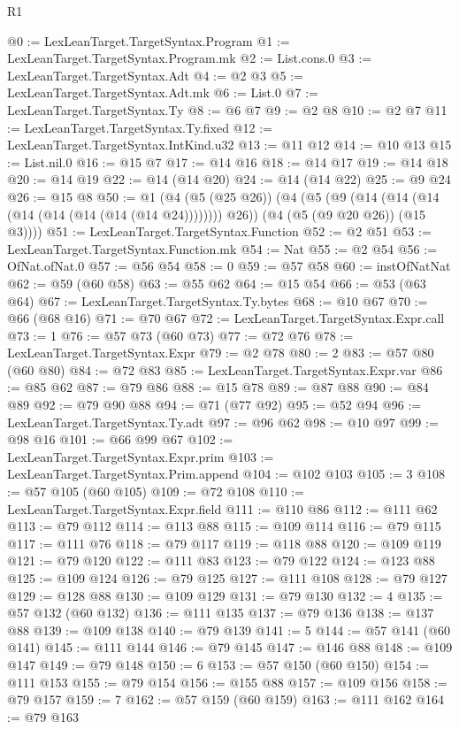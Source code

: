 \begin{lexlean}{R1}
\begin{coremodule}
@0 := LexLeanTarget.TargetSyntax.Program
@1 := LexLeanTarget.TargetSyntax.Program.mk
@2 := List.cons.{0}
@3 := LexLeanTarget.TargetSyntax.Adt
@4 := @2 @3
@5 := LexLeanTarget.TargetSyntax.Adt.mk
@6 := List.{0}
@7 := LexLeanTarget.TargetSyntax.Ty
@8 := @6 @7
@9 := @2 @8
@10 := @2 @7
@11 := LexLeanTarget.TargetSyntax.Ty.fixed
@12 := LexLeanTarget.TargetSyntax.IntKind.u32
@13 := @11 @12
@14 := @10 @13
@15 := List.nil.{0}
@16 := @15 @7
@17 := @14 @16
@18 := @14 @17
@19 := @14 @18
@20 := @14 @19
@22 := @14 (@14 @20)
@24 := @14 (@14 @22)
@25 := @9 @24
@26 := @15 @8
@50 := @1
    (@4
      (@5 (@25 @26))
      (@4
        (@5 (@9 (@14 (@14 (@14 (@14 (@14 (@14 (@14 (@14 @24)))))))) @26))
        (@4 (@5 (@9 @20 @26)) (@15 @3))))
@51 := LexLeanTarget.TargetSyntax.Function
@52 := @2 @51
@53 := LexLeanTarget.TargetSyntax.Function.mk
@54 := Nat
@55 := @2 @54
@56 := OfNat.ofNat.{0}
@57 := @56 @54
@58 := 0
@59 := @57 @58
@60 := instOfNatNat
@62 := @59 (@60 @58)
@63 := @55 @62
@64 := @15 @54
@66 := @53 (@63 @64)
@67 := LexLeanTarget.TargetSyntax.Ty.bytes
@68 := @10 @67
@70 := @66 (@68 @16)
@71 := @70 @67
@72 := LexLeanTarget.TargetSyntax.Expr.call
@73 := 1
@76 := @57 @73 (@60 @73)
@77 := @72 @76
@78 := LexLeanTarget.TargetSyntax.Expr
@79 := @2 @78
@80 := 2
@83 := @57 @80 (@60 @80)
@84 := @72 @83
@85 := LexLeanTarget.TargetSyntax.Expr.var
@86 := @85 @62
@87 := @79 @86
@88 := @15 @78
@89 := @87 @88
@90 := @84 @89
@92 := @79 @90 @88
@94 := @71 (@77 @92)
@95 := @52 @94
@96 := LexLeanTarget.TargetSyntax.Ty.adt
@97 := @96 @62
@98 := @10 @97
@99 := @98 @16
@101 := @66 @99 @67
@102 := LexLeanTarget.TargetSyntax.Expr.prim
@103 := LexLeanTarget.TargetSyntax.Prim.append
@104 := @102 @103
@105 := 3
@108 := @57 @105 (@60 @105)
@109 := @72 @108
@110 := LexLeanTarget.TargetSyntax.Expr.field
@111 := @110 @86
@112 := @111 @62
@113 := @79 @112
@114 := @113 @88
@115 := @109 @114
@116 := @79 @115
@117 := @111 @76
@118 := @79 @117
@119 := @118 @88
@120 := @109 @119
@121 := @79 @120
@122 := @111 @83
@123 := @79 @122
@124 := @123 @88
@125 := @109 @124
@126 := @79 @125
@127 := @111 @108
@128 := @79 @127
@129 := @128 @88
@130 := @109 @129
@131 := @79 @130
@132 := 4
@135 := @57 @132 (@60 @132)
@136 := @111 @135
@137 := @79 @136
@138 := @137 @88
@139 := @109 @138
@140 := @79 @139
@141 := 5
@144 := @57 @141 (@60 @141)
@145 := @111 @144
@146 := @79 @145
@147 := @146 @88
@148 := @109 @147
@149 := @79 @148
@150 := 6
@153 := @57 @150 (@60 @150)
@154 := @111 @153
@155 := @79 @154
@156 := @155 @88
@157 := @109 @156
@158 := @79 @157
@159 := 7
@162 := @57 @159 (@60 @159)
@163 := @111 @162
@164 := @79 @163

\end{coremodule}
\end{lexlean}
